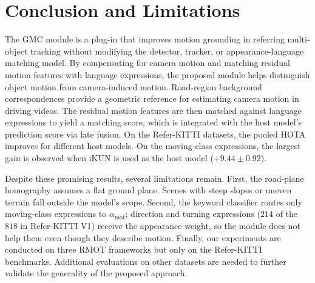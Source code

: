 \documentclass{article}
\begin{document}
\section{Conclusion and Limitations}
\label{sec:conclusion}
The GMC module is a plug-in that improves motion grounding in referring multi-object tracking without modifying the detector, tracker, or appearance-language matching model. By compensating for camera motion and matching residual motion features with language expressions, the proposed module helps distinguish object motion from camera-induced motion. Road-region background correspondences provide a geometric reference for estimating camera motion in driving videos. The residual motion features are then matched against language expressions to yield a matching score, which is integrated with the host model's prediction score via late fusion. On the Refer-KITTI datasets, the pooled HOTA improves for different host models. On the moving-class expressions, the largest gain is observed when iKUN is used as the host model ($+9.44\pm0.92$).

Despite these promising results, several limitations remain. First, the road-plane homography assumes a flat ground plane. Scenes with steep slopes or uneven terrain fall outside the model's scope. Second, the keyword classifier routes only moving-class expressions to $\alpha_{\mathrm{mot}}$; direction and turning expressions ($214$ of the $818$ in Refer-KITTI V1) receive the appearance weight, so the module does not help them even though they describe motion. Finally, our experiments are conducted on three RMOT frameworks but only on the Refer-KITTI benchmarks. Additional evaluations on other datasets are needed to further validate the generality of the proposed approach.



\end{document}
